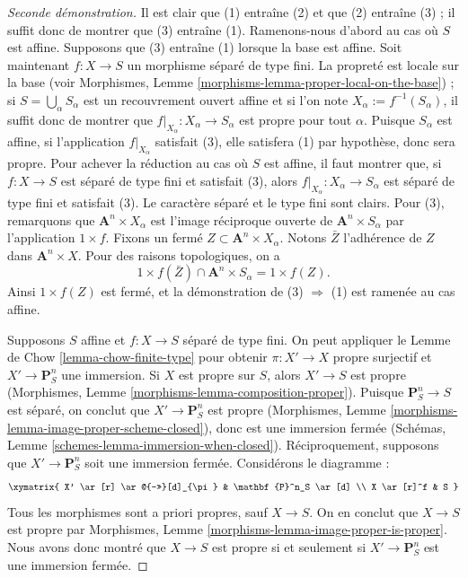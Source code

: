 \begin{proof}[Seconde démonstration]
Il est clair que (1) entraîne (2) et que (2) entraîne (3) ; il suffit donc de montrer que (3)
entraîne (1).
Ramenons-nous d'abord au cas où $S$ est affine. Supposons que (3) entraîne (1)
lorsque la base est affine. Soit maintenant $f: X \to S$ un morphisme séparé de
type fini. La propreté est locale sur la base
(voir Morphismes, Lemme \ref{morphisms-lemma-proper-local-on-the-base}) ; si
$S = \bigcup_\alpha S_\alpha$ est un recouvrement ouvert affine et si
l'on note $X_\alpha := f^{-1}(S_\alpha)$, il
suffit donc de montrer que $f|_{X_\alpha}: X_\alpha \to S_\alpha$ est propre
pour tout $\alpha$. Puisque $S_\alpha$ est affine, si
l'application $f|_{X_\alpha}$ satisfait (3), elle satisfera (1)
par hypothèse, donc sera propre. Pour achever la réduction au
cas où $S$ est affine, il faut montrer que, si $f: X \to S$ est séparé de
type fini et satisfait (3), alors $f|_{X_\alpha} : X_\alpha \to S_\alpha$
est séparé de type fini et satisfait (3). Le caractère séparé et le type
fini sont clairs. Pour (3), remarquons que
$\mathbf{A}^n \times X_\alpha$ est l'image réciproque ouverte de
$\mathbf{A}^n \times S_\alpha$ par l'application $1 \times f$. Fixons un
fermé $Z \subset \mathbf A^n \times X_\alpha$. Notons $\bar Z$
l'adhérence de $Z$ dans $\mathbf{A}^n \times X$. Pour des raisons
topologiques, on a
$$
1 \times f(\bar Z) \cap \mathbf{A}^n \times S_\alpha  = 1 \times f(Z).
$$
Ainsi $1 \times f(Z)$ est fermé, et la démonstration de
(3) $\Rightarrow$ (1) est ramenée au cas affine.

\medskip\noindent
Supposons $S$ affine et $f : X \to S$ séparé de type fini.
On peut appliquer le Lemme de Chow \ref{lemma-chow-finite-type}
pour obtenir $\pi : X' \to X$ propre surjectif et $X' \to \mathbf{P}^n_S$
une immersion. Si $X$ est propre sur $S$, alors $X' \to S$ est propre
(Morphismes, Lemme \ref{morphisms-lemma-composition-proper}). Puisque
$\mathbf{P}^n_S \to S$ est séparé, on conclut que $X' \to
\mathbf{P}^n_S$ est propre
(Morphismes, Lemme \ref{morphisms-lemma-image-proper-scheme-closed}),
donc est une immersion fermée
(Schémas, Lemme \ref{schemes-lemma-immersion-when-closed}).
Réciproquement, supposons que $X' \to \mathbf{P}^n_S$ soit une immersion fermée.
Considérons le diagramme :
\begin{equation}
\label{equation-check-proper}
\xymatrix{
X' \ar[r] \ar@{->>}[d]_{\pi} &
\mathbf{P}^n_S \ar[d] \\
X \ar[r]^f & S
}
\end{equation}
Tous les morphismes sont a priori propres, sauf $X \to S$.
On en conclut que $X \to S$ est propre par
Morphismes, Lemme \ref{morphisms-lemma-image-proper-is-proper}.
Nous avons donc montré que $X \to S$ est propre si et seulement si
$X' \to \mathbf{P}^n_S$ est une immersion fermée.


\end{proof}
